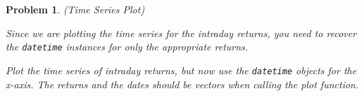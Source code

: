 \documentclass[12pt, a4paper]{article}
\newtheorem{problem}{Problem}
\begin{document}
\begin{problem}
(Time Series Plot)

Since we are plotting the time series for the intraday returns, you need to recover the \texttt{datetime} instances for only the appropriate returns.

Plot the time series of intraday returns, but now use the \texttt{datetime} objects for the x-axis.
The returns and the dates should be vectors when calling the plot function.
\end{problem}
\end{document}
